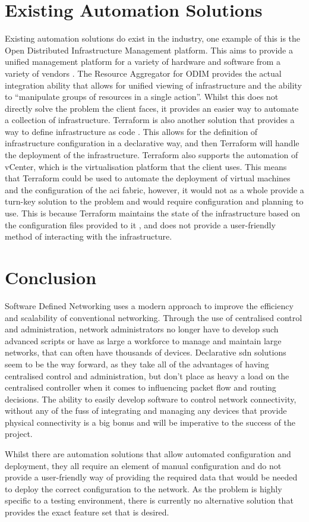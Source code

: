 \section{Existing Automation Solutions}
Existing automation solutions do exist in the industry, one example of this is the Open Distributed Infrastructure Management platform. This aims to provide a unified management platform for a variety of hardware and software from a variety of vendors \citep{lfnetworking}. The Resource Aggregator for ODIM \citep{resourceaggregator} provides the actual integration ability that allows for unified viewing of infrastructure and the ability to ``manipulate groups of resources in a single action''. Whilst this does not directly solve the problem the client faces, it provides an easier way to automate a collection of infrastructure. Terraform is also another solution that provides a way to define infrastructure as code \citep{terraform}. This allows for the definition of infrastructure configuration in a declarative way, and then Terraform will handle the deployment of the infrastructure. Terraform also supports the automation of vCenter, which is the virtualisation platform that the client uses. This means that Terraform could be used to automate the deployment of virtual machines and the configuration of the \gls{aci} fabric, however, it would not as a whole provide a turn-key solution to the problem and would require configuration and planning to use. This is because Terraform maintains the state of the infrastructure based on the configuration files provided to it \citep{multi-domain}, and does not provide a user-friendly method of interacting with the infrastructure.

\section{Conclusion}
\label{litreview:conclusion}
Software Defined Networking uses a modern approach to
improve the efficiency and scalability of conventional networking. Through the
use of centralised control and administration, network administrators no longer
have to develop such advanced scripts or have as large a workforce to manage
and maintain large networks, that can often have thousands of devices.
Declarative \gls{sdn} solutions seem to be the way forward, as they take all of
the advantages of having centralised control and administration, but don't
place as heavy a load on the centralised controller when it comes to
influencing packet flow and routing decisions. The ability to easily develop
software to control network connectivity, without any of the fuss of
integrating and managing any devices that provide physical connectivity is a
big bonus and will be imperative to the success of the project. 

Whilst there are automation solutions that allow automated configuration and deployment, they all require an element of manual configuration and do not provide a user-friendly way of providing the required data that would be needed to deploy the correct configuration to the network. As the problem is highly specific to a testing environment, there is currently no alternative solution that provides the exact feature set that is desired.